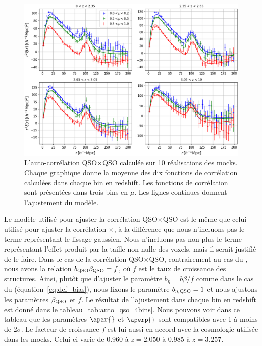 \begin{figure}
  \centering
  \includegraphics[scale=0.4]{auto_qso_4bins}
  \caption{L'auto-corrélation QSO$\times$QSO calculée sur 10 réalisations des mocks. Chaque graphique donne la moyenne des dix fonctions de corrélation calculées dans chaque bin en redshift. Les fonctions de corrélation sont présentées dans trois bins en $\mu$. Les lignes continues donnent l'ajustement du modèle.}
  \label{fig:auto_qso_4bins}
\end{figure}

Le modèle utilisé pour ajuster la corrélation QSO$\times$QSO est le même que celui utilisé pour ajuster la corrélation \lya{}$\times$\lya{}, à la différence que nous n'incluons pas le terme représentant le lissage gaussien. %
Nous n'incluons pas non plus le terme représentant l'effet produit par la taille non nulle des voxels, mais il serait justifié de le faire.
Dans le cas de la corrélation QSO$\times$QSO, contrairement au cas du \lya{}, nous avons la relation $b_{\textsc{QSO}} \beta_{\textsc{QSO}} = f$, où $f$ est le taux de croissance des structures.
Ainsi, plutôt que d'ajuster le paramètre $b_{\eta} = b \beta / f$ comme dans le cas du \lya{} (équation~\ref{eq:def_bias}), nous fixons le paramètre $b_{\eta, \textsc{QSO}} = 1$ et nous ajustons les paramètres $\beta_{\textsc{QSO}}$ et $f$.
Le résultat de l'ajustement dans chaque bin en redshift est donné dans le tableau~\ref{tab:auto_qso_4bins}.
Nous pouvons voir dans ce tableau que les paramètres $\apar{}$ et $\aperp{}$ sont compatibles avec 1 à moins de $2 \sigma $.
Le facteur de croissance $f$ est lui aussi en accord avec la cosmologie utilisée dans les mocks. Celui-ci varie de \num{0.960} à $z=\num{2.050}$ à \num{0.985} à $z=\num{3.257}$.

